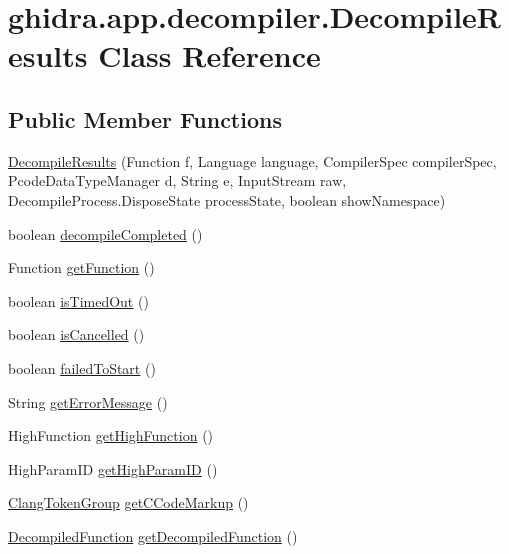 \hypertarget{classghidra_1_1app_1_1decompiler_1_1_decompile_results}{}\section{ghidra.\+app.\+decompiler.\+Decompile\+Results Class Reference}
\label{classghidra_1_1app_1_1decompiler_1_1_decompile_results}
\subsection*{Public Member Functions}
\begin{DoxyCompactItemize}
\item 
\mbox{\hyperlink{classghidra_1_1app_1_1decompiler_1_1_decompile_results_a4e5409416abab86fe80ced741f490367}{Decompile\+Results}} (Function f, Language language, Compiler\+Spec compiler\+Spec, Pcode\+Data\+Type\+Manager d, String e, Input\+Stream raw, Decompile\+Process.\+Dispose\+State process\+State, boolean show\+Namespace)
\item 
boolean \mbox{\hyperlink{classghidra_1_1app_1_1decompiler_1_1_decompile_results_a2b822a34cffee3be06469c05330321bb}{decompile\+Completed}} ()
\item 
Function \mbox{\hyperlink{classghidra_1_1app_1_1decompiler_1_1_decompile_results_ae0f744db17c1404de98c893d27d30095}{get\+Function}} ()
\item 
boolean \mbox{\hyperlink{classghidra_1_1app_1_1decompiler_1_1_decompile_results_a09090a559208bc50b2490ca3f14898b0}{is\+Timed\+Out}} ()
\item 
boolean \mbox{\hyperlink{classghidra_1_1app_1_1decompiler_1_1_decompile_results_a4777184173e22095d06f713a354e5f1e}{is\+Cancelled}} ()
\item 
boolean \mbox{\hyperlink{classghidra_1_1app_1_1decompiler_1_1_decompile_results_a4b0eb77c8b21c1eba93df8539102b9f0}{failed\+To\+Start}} ()
\item 
String \mbox{\hyperlink{classghidra_1_1app_1_1decompiler_1_1_decompile_results_a239fb0781f15435446ab8b3b11abc079}{get\+Error\+Message}} ()
\item 
High\+Function \mbox{\hyperlink{classghidra_1_1app_1_1decompiler_1_1_decompile_results_a47a5e5504a7d915f1edecbca48977e2e}{get\+High\+Function}} ()
\item 
High\+Param\+ID \mbox{\hyperlink{classghidra_1_1app_1_1decompiler_1_1_decompile_results_a272e9f87e48dde339d3648090af78ab0}{get\+High\+Param\+ID}} ()
\item 
\mbox{\hyperlink{classghidra_1_1app_1_1decompiler_1_1_clang_token_group}{Clang\+Token\+Group}} \mbox{\hyperlink{classghidra_1_1app_1_1decompiler_1_1_decompile_results_a1ca085b179f273b38e002f2b2f24cb5d}{get\+C\+Code\+Markup}} ()
\item 
\mbox{\hyperlink{classghidra_1_1app_1_1decompiler_1_1_decompiled_function}{Decompiled\+Function}} \mbox{\hyperlink{classghidra_1_1app_1_1decompiler_1_1_decompile_results_a2cc778a7c03ea4f665d380fd91891e1f}{get\+Decompiled\+Function}} ()
\end{DoxyCompactItemize}


